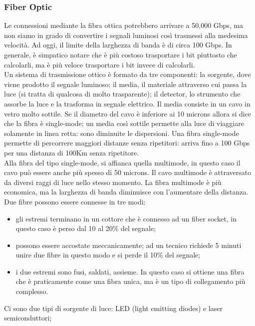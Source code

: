 \documentclass{article}
\begin{document}
\subsubsection{Fiber Optic}
Le connessioni mediante la fibra ottica potrebbero arrivare a 50,000 Gbps, ma
non siamo in grado di convertire i segnali luminosi così trasmessi alla medesima
velocità. Ad oggi, il limite della larghezza di banda è di circa 100 Gbps. In
generale, è simpatico notare che è più costoso trasportare i bit piuttosto che
calcolarli, ma è più veloce trasportare i bit invece di calcolarli.\\
Un sistema di trasmissione ottico è formato da tre componenti: la sorgente, dove
viene prodotto il segnale luminoso; il media, il materiale attraverso cui passa
la luce (si tratta di qualcosa di molto trasparente); il detector, lo strumento
che assorbe la luce e la trasforma in segnale elettrico. Il media consiste in un
cavo in vetro molto sottile. Se il diametro del cavo è inferiore ai 10 microns
allora si dice che la fibra è single-mode; un media così sottile permette alla
luce di viaggiare solamente in linea retta: sono diminuite le dispersioni.
Una fibra single-mode permette di percorrere maggiori distanze senza ripetitori:
arriva fino a 100 Gbps per una distanza di 100Km senza ripetitore.\\
Alla fibra del tipo single-mode, si affianca quella multimode, in questo caso il
cavo può essere anche più spesso di 50 microns. Il cavo multimode è
attraversato da diversi raggi di luce nello stesso momento. La fibra multimode è
più economica, ma la larghezza di banda diminuisce con l'aumentare della
distanza.\\

Due fibre possono essere connesse in tre modi:
\begin{itemize}
	\item gli estremi terminano in un cottore che è connesso ad un fiber socket,
	      in questo caso è perso dal 10 al 20\% del segnale;
	\item possono essere accostate meccanicamente; ad un tecnico richiede 5
	      minuti unire due fibre in questo modo e si perde il 10\% del segnale;
	\item i due estremi sono fusi, saldati, assieme. In questo caso si ottiene
	      una fibra che è praticamente come una fibra unica, ma è un tipo di
	      collegamento più complesso.
\end{itemize}

Ci sono due tipi di sorgente di luce: LED (light emitting diodes) e laser
semiconduttori;
\end{document}
